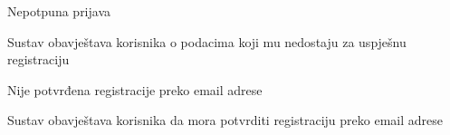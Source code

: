 \begin{packed_item}
\begin{packed_item}
\begin{packed_enum}
								\end{packed_enum}
							
							\item[3.c] Nepotpuna prijava \begin{packed_enum}
								
								\item Sustav obavještava korisnika o podacima koji mu nedostaju za uspješnu registraciju
								
								\end{packed_enum}
							
							\item[5.a] Nije potvrđena registracije preko email adrese \begin{packed_enum}
								
								\item Sustav obavještava korisnika da mora potvrditi registraciju preko email adrese
								
							\end{packed_enum}
							
						\end{packed_item}
						
					\end{packed_item}
					
